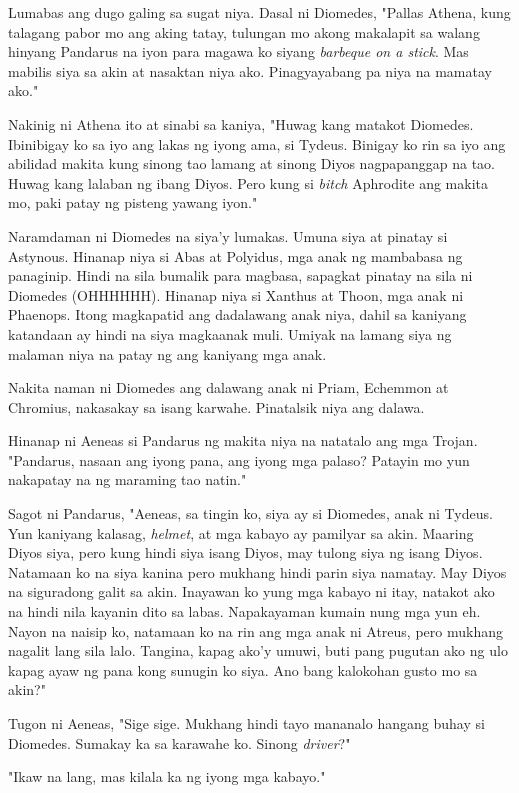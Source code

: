 \documentclass[12pt,letterpaper]{report}
\begin{document}
Lumabas ang dugo galing sa sugat niya. Dasal ni Diomedes, "Pallas Athena, kung talagang pabor mo ang aking tatay, tulungan mo akong makalapit sa walang hinyang Pandarus na iyon para magawa ko siyang \textit{barbeque on a stick}. Mas mabilis siya sa akin at nasaktan niya ako. Pinagyayabang pa niya na mamatay ako."

Nakinig ni Athena ito at sinabi sa kaniya, "Huwag kang matakot Diomedes. Ibinibigay ko sa iyo ang lakas ng iyong ama, si Tydeus. Binigay ko rin sa iyo ang abilidad makita kung sinong tao lamang at sinong Diyos nagpapanggap na tao. Huwag kang lalaban ng ibang Diyos. Pero kung si \textit{bitch} Aphrodite ang makita mo, paki patay ng pisteng yawang iyon."

Naramdaman ni Diomedes na siya'y lumakas. Umuna siya at pinatay si Astynous. Hinanap niya si Abas at Polyidus, mga anak ng mambabasa ng panaginip. Hindi na sila bumalik para magbasa, sapagkat pinatay na sila ni Diomedes (OHHHHHH). Hinanap niya si Xanthus at Thoon, mga anak ni Phaenops. Itong magkapatid ang dadalawang anak niya, dahil sa kaniyang katandaan ay hindi na siya magkaanak muli. Umiyak na lamang siya ng malaman niya na patay ng ang kaniyang mga anak.

Nakita naman ni Diomedes ang dalawang anak ni Priam, Echemmon at Chromius, nakasakay sa isang karwahe. Pinatalsik niya ang dalawa.

Hinanap ni Aeneas si Pandarus ng makita niya na natatalo ang mga Trojan. "Pandarus, nasaan ang iyong pana, ang iyong mga palaso? Patayin mo yun nakapatay na ng maraming tao natin."

Sagot ni Pandarus, "Aeneas, sa tingin ko, siya ay si Diomedes, anak ni Tydeus. Yun kaniyang kalasag, \textit{helmet}, at mga kabayo ay pamilyar sa akin. Maaring Diyos siya, pero kung hindi siya isang Diyos, may tulong siya ng isang Diyos. Natamaan ko na siya kanina pero mukhang hindi parin siya namatay. May Diyos na siguradong galit sa akin. Inayawan ko yung mga kabayo ni itay, natakot ako na hindi nila kayanin dito sa labas. Napakayaman kumain nung mga yun eh. Nayon na naisip ko, natamaan ko na rin ang mga anak ni Atreus, pero mukhang nagalit lang sila lalo. Tangina, kapag ako'y umuwi, buti pang pugutan ako ng ulo kapag ayaw ng pana kong sunugin ko siya. Ano bang kalokohan gusto mo sa akin?"

Tugon ni Aeneas, "Sige sige. Mukhang hindi tayo mananalo hangang buhay si Diomedes. Sumakay ka sa karawahe ko. Sinong \textit{driver}?"

"Ikaw na lang, mas kilala ka ng iyong mga kabayo."
\end{document}
